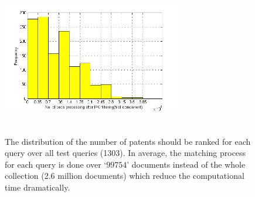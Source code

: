 \begin{figure}[t!]
   \centering
   \includegraphics[width=0.70\textwidth,height=68mm]{figs/firstTwoIpcFilter-histo.png}
   \caption{The distribution of the number of patents should be ranked for each query over all test queries (1303).
In average, the matching process for each query is done over `$ 99754 $' documents instead of the whole collection (2.6 million documents) which reduce the computational time dramatically.}   
   \label{fig:firstTwoIpcFilter-histo} 
\end{figure}
